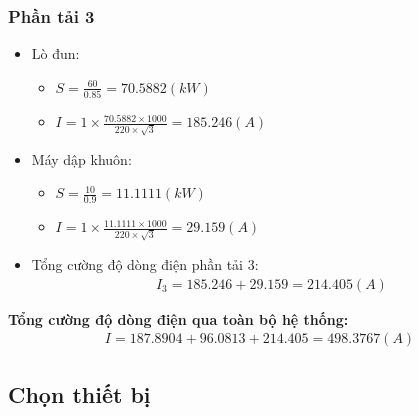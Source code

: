         \subsubsection{Phần tải 3}
            \begin{itemize}
                \item Lò đun:
                    \begin{itemize}
                        \item $S = \frac{60}{0.85} = 70.5882 (kW)$
                        \item $I = 1 \times \frac{70.5882 \times 1000}{220 \times \sqrt{3}} = 185.246 (A)$
                    \end{itemize}
                \item Máy dập khuôn:
                    \begin{itemize}
                        \item $S = \frac{10}{0.9} = 11.1111 (kW)$
                        \item $I = 1 \times \frac{11.1111 \times 1000}{220 \times \sqrt{3}} = 29.159 (A)$
                    \end{itemize}
                \item Tổng cường độ dòng điện phần tải 3:
                    \begin{align*}
                        I_{3} = 185.246 + 29.159 = 214.405 (A)
                    \end{align*}
            \end{itemize}
        \textbf{Tổng cường độ dòng điện qua toàn bộ hệ thống:}
        \begin{align*}
            I = 187.8904 + 96.0813 + 214.405 = 498.3767 (A)
        \end{align*}
    \subsection{Chọn thiết bị}
